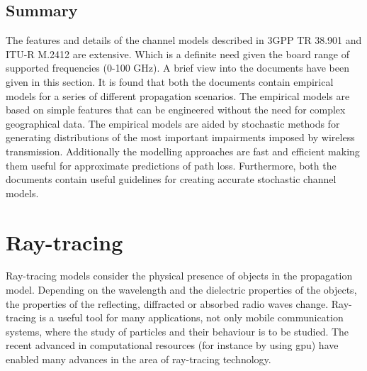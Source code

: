 \subsection{Summary}

The features and details of the channel models described in 3GPP TR 38.901 and ITU-R M.2412 are extensive. Which is a definite need given the board range of supported frequencies (0-100 GHz). A brief view into the documents have been given in this section. It is found that both the documents contain empirical models for a series of different propagation scenarios. The empirical models are based on simple features that can be engineered without the need for complex geographical data. The empirical models are aided by stochastic methods for generating distributions of the most important impairments imposed by wireless transmission. Additionally the modelling approaches are fast and efficient making them useful for approximate predictions of path loss. Furthermore, both the documents contain useful guidelines for creating accurate stochastic channel models. 




\section{Ray-tracing}\label{sec:ray-tracing}

Ray-tracing models consider the physical presence of objects in the propagation model. Depending on the wavelength and the dielectric properties of the objects, the properties of the reflecting, diffracted or absorbed radio waves change. Ray-tracing is a useful tool for many applications, not only mobile communication systems, where the study of particles and their behaviour is to be studied. The recent advanced in computational resources (for instance by using \gls{gpu}) have enabled many advances in the area of ray-tracing technology.

